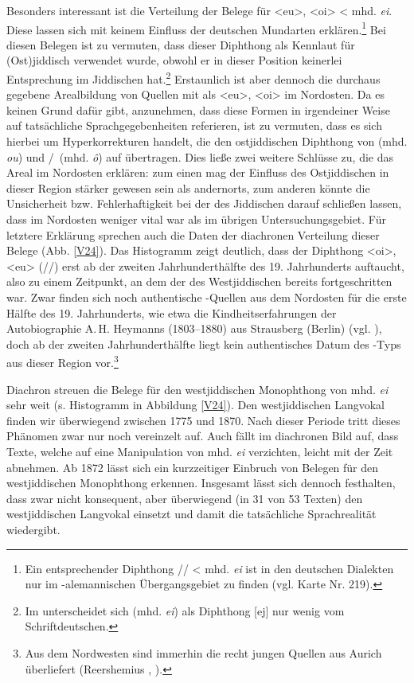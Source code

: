  Besonders interessant ist die Verteilung der Belege für <eu>, <oi> < mhd. \textit{ei}. Diese lassen sich mit keinem Einfluss der deutschen Mundarten erklären.\footnote{Ein entsprechender Diphthong // < mhd. \textit{ei} ist in den deutschen Dialekten nur im -alemannischen Übergangsgebiet zu finden (vgl.  Karte Nr. 219).} Bei diesen Belegen ist zu vermuten, dass dieser Diphthong als Kennlaut für (Ost)jiddisch verwendet wurde, obwohl er in dieser Position keinerlei Entsprechung im Jiddischen hat.\footnote{Im  unterscheidet sich  (mhd. \textit{ei}) als Diphthong [ej] nur wenig vom Schriftdeutschen.} Erstaunlich ist aber dennoch die durchaus gegebene Arealbildung von Quellen mit  als <eu>, <oi> im Nordosten. Da es keinen Grund dafür gibt, anzunehmen, dass diese Formen in irgendeiner Weise auf tatsächliche Sprachgegebenheiten referieren, ist zu vermuten, dass es sich hierbei um Hyperkorrekturen handelt, die den ostjiddischen Diphthong von  (mhd. \textit{ou}) und /\, (mhd. \textit{ô}) auf  übertragen. Dies ließe zwei weitere Schlüsse zu, die das Areal im Nordosten erklären: zum einen mag der Einfluss des Ostjiddischen in dieser Region stärker gewesen sein als andernorts,  zum anderen könnte die Unsicherheit bzw. Fehlerhaftigkeit bei der  des Jiddischen darauf schließen lassen, dass im Nordosten  weniger vital war als im übrigen Untersuchungsgebiet. Für letztere Erklärung sprechen auch die Daten der diachronen Verteilung dieser Belege (Abb. \ref{V24}). Das Histogramm zeigt deutlich, dass der Diphthong <oi>, <eu> (//) erst ab der zweiten Jahrhunderthälfte des 19. Jahrhunderts auftaucht, also zu einem Zeitpunkt, an dem der  des Westjiddischen bereits fortgeschritten war. Zwar finden sich noch authentische -Quellen aus dem Nordosten für die erste Hälfte des 19. Jahrhunderts, wie etwa die Kindheitserfahrungen der Autobiographie A.\,H. Heymanns (1803–1880) aus Strausberg (Berlin) (vgl. \cite{Schaefer2013}), doch ab der zweiten Jahrhunderthälfte liegt kein authentisches Datum des -Typs aus dieser Region vor.\footnote{Aus dem Nordwesten sind immerhin die recht jungen Quellen aus Aurich überliefert (Reershemius \citeyear{Reershemius2007}, \citeyear{Reershemius2014}).}
 
 Diachron streuen die Belege für den westjiddischen Monophthong von mhd. \textit{ei} sehr weit (s. Histogramm in Abbildung \ref{V24}). Den westjiddischen Langvokal finden wir überwiegend zwischen 1775 und 1870. Nach dieser Periode tritt dieses Phänomen zwar nur noch vereinzelt auf.  Auch fällt im diachronen Bild auf, dass Texte, welche auf eine Manipulation von mhd. \textit{ei} verzichten, leicht mit der Zeit abnehmen. Ab 1872 lässt sich  ein kurzzeitiger Einbruch von Belegen für den westjiddischen Monophthong erkennen. Insgesamt lässt sich dennoch festhalten, dass  zwar nicht konsequent, aber überwiegend (in 31 von 53 Texten) den westjiddischen Langvokal einsetzt und damit die tatsächliche Sprachrealität wiedergibt.\\
 
